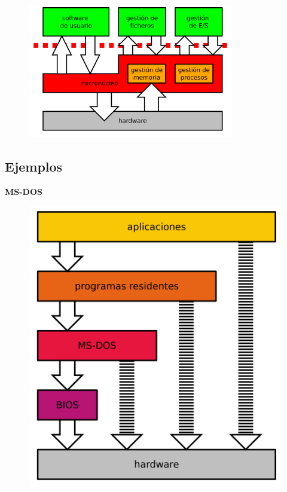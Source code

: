 \documentclass{article}
\begin{document}
\begin{figure}[h]
\centering
\includegraphics[scale=1,width=90mm]{hibrida.png}
\end{figure}

\newpage
\subsection{Ejemplos}
\textbf{MS-DOS}
\begin{figure}[h]
\centering
\includegraphics[scale=1,width=\textwidth]{MSDOS.png}
\end{figure}

\newpage
\end{document}
